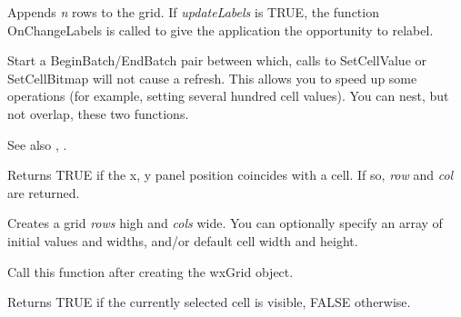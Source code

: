 \label{wxgridappendrows}


Appends {\it n} rows to the grid. If {\it updateLabels} is TRUE,
the function OnChangeLabels is called to give the application the opportunity to relabel.

\label{wxgridbeginbatch}


Start a BeginBatch/EndBatch pair between which, calls to SetCellValue or
SetCellBitmap will not cause a refresh. This allows you to speed up some operations
(for example, setting several hundred cell values). You can nest, but not overlap,
these two functions.

See also , .

\label{wxgridcellhittest}


Returns TRUE if the x, y panel position coincides with a cell. If so, {\it row} and {\it col} are
returned.

\label{wxgridcreategrid}


Creates a grid {\it rows} high and {\it cols} wide. You can optionally specify an array of initial values
and widths, and/or default cell width and height.

Call this function after creating the wxGrid object.

\label{wxgridcurrentcellvisible}


Returns TRUE if the currently selected cell is visible, FALSE otherwise.

\label{wxgriddeletecols}


